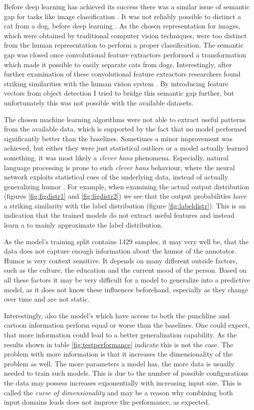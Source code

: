 \documentclass[draft,final,oneside]{vutinfth} %
\begin{document}
Before deep learning has achieved its success there was a similar issue of semantic gap for tasks like image classification \cite{dlvc}. It was not reliably possible to distinct a cat from a dog, before deep learning \cite{alexnet}. As the chosen representation for images, which were obtained by traditional computer vision techniques, were too distinct from the human representation to perform a proper classification. The semantic gap was closed once convolutional feature extractors performed a transformation which made it possible to easily separate cats from dogs. Interestingly, after further examination of these convolutional feature extractors researchers found striking similarities with the human vision system  \cite{Cichy2016}. By introducing feature vectors from object detection I tried to bridge this semantic gap further, but unfortunately this was not possible with the available datasets.

The chosen machine learning algorithms were not able to extract useful patterns from the available data, which is supported by the fact that no model performed significantly better than the baselines. Sometimes a minor improvement was achieved, but either they were just statistical outliers or a model actually learned something, it was most likely a \textit{clever hans} phenomena. Especially, natural language processing is prone to such \textit{clever hans} behaviour, where the neural network exploits statistical cues of the underlying data, instead of actually generalizing humor \cite{cleverhans}. For example, when examining the actual output distribution (figures \ref{fig:figdistr1} and \ref{fig:figdistr2}) we see that the output probabilities have a striking similarity with the label distribution (figure \ref{fig:labeldistr}). This is an indication that the trained models do not extract useful features and instead learn a to mainly approximate the label distribution.

As the model's training split contains 1429 samples, it may very well be, that the data does not capture enough information about the humor of the annotator. Humor is very context sensitive. It depends on many different outside factors, such as the culture, the education and the current mood of the person. Based on all these factors it may be very difficult for a model to generalize into a predictive model, as it does not know these influences beforehand, especially as they change over time and are not static.

Interestingly, also the model's which have access to both the punchline and cartoon information perform equal or worse than the baselines. One could expect, that more information could lead to a better generalization capability. As the results shown in table \ref{fig:testperformance} indicate this is not the case. The problem with more information is that it increases the dimensionality of the problem as well. The more parameters a model has, the more data is usually needed to train such models. This is due to the number of possible configurations the data may possess increases exponentially with increasing input size. This is called the \textit{curse of dimensionality} \cite{Goodfellow-et-al-2016} and may be a reason why combining both input domains leads does not improve the performance, as expected.
\end{document}
